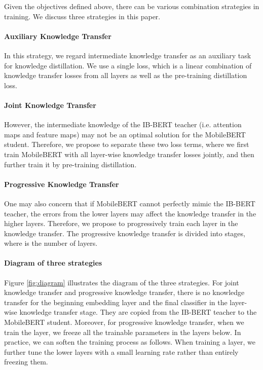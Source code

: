 \documentclass[11pt,a4paper]{article}
\begin{document}
Given the objectives defined above, there can be various combination strategies in training. We discuss three strategies in this paper.

\paragraph{Auxiliary Knowledge Transfer}

In this strategy, we regard intermediate knowledge transfer as an auxiliary task for knowledge distillation. We use a single loss, which is a linear combination of knowledge transfer losses from all layers as well as the pre-training distillation loss.

\paragraph{Joint Knowledge Transfer}

However, the intermediate knowledge of the IB-BERT teacher (i.e. attention maps and feature maps) may not be an optimal solution for the MobileBERT student.
Therefore, we propose to separate these two loss terms, where we first train MobileBERT with all layer-wise knowledge transfer losses jointly, and then further train it by pre-training distillation.

\paragraph{Progressive Knowledge Transfer}

One may also concern that if MobileBERT cannot perfectly mimic the IB-BERT teacher, the errors from the lower layers may affect the knowledge transfer in the higher layers. Therefore, we propose to progressively train each layer in the knowledge transfer. The progressive knowledge transfer is divided into  stages, where  is the number of layers.


\paragraph{Diagram of three strategies}

Figure \ref{fig:diagram} illustrates the diagram of the three strategies. For joint knowledge transfer and progressive knowledge transfer, there is no knowledge transfer for the beginning embedding layer and the final classifier in the layer-wise knowledge transfer stage. They are copied from the IB-BERT teacher to the MobileBERT student. Moreover, for progressive knowledge transfer, when we train the  layer,  we freeze all the trainable parameters in the layers below. In practice, we can soften the training process as follows. When training a layer, we further tune the lower layers with a small learning rate rather than entirely freezing them.
\end{document}
